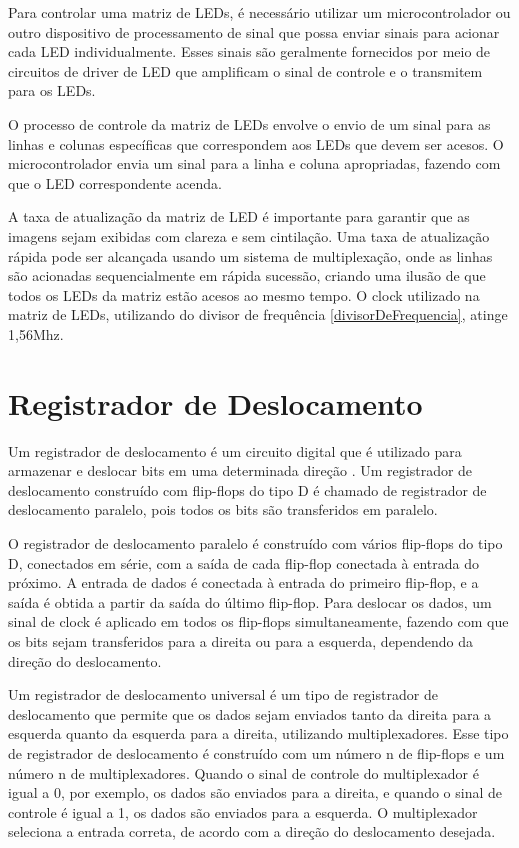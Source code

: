 Para controlar uma matriz de LEDs, é necessário utilizar um microcontrolador ou outro dispositivo de processamento de sinal que possa enviar sinais para acionar cada LED individualmente. Esses sinais são geralmente fornecidos por meio de circuitos de driver de LED que amplificam o sinal de controle e o transmitem para os LEDs.

O processo de controle da matriz de LEDs envolve o envio de um sinal para as linhas e colunas específicas que correspondem aos LEDs que devem ser acesos. O microcontrolador envia um sinal para a linha e coluna apropriadas, fazendo com que o LED correspondente acenda.

A taxa de atualização da matriz de LED é importante para garantir que as imagens sejam exibidas com clareza e sem cintilação. Uma taxa de atualização rápida pode ser alcançada usando um sistema de multiplexação, onde as linhas são acionadas sequencialmente em rápida sucessão, criando uma ilusão de que todos os LEDs da matriz estão acesos ao mesmo tempo. O clock utilizado na matriz de LEDs, utilizando do divisor de frequência \ref{divisorDeFrequencia}, atinge 1,56Mhz.

\section{Registrador de Deslocamento}
Um registrador de deslocamento é um circuito digital que é utilizado para armazenar e deslocar bits em uma determinada direção \cite{tocci2010sistemas}. Um registrador de deslocamento construído com flip-flops do tipo D é chamado de registrador de deslocamento paralelo, pois todos os bits são transferidos em paralelo.

O registrador de deslocamento paralelo é construído com vários flip-flops do tipo D, conectados em série, com a saída de cada flip-flop conectada à entrada do próximo. A entrada de dados é conectada à entrada do primeiro flip-flop, e a saída é obtida a partir da saída do último flip-flop. Para deslocar os dados, um sinal de clock é aplicado em todos os flip-flops simultaneamente, fazendo com que os bits sejam transferidos para a direita ou para a esquerda, dependendo da direção do deslocamento.

Um registrador de deslocamento universal é um tipo de registrador de deslocamento que permite que os dados sejam enviados tanto da direita para a esquerda quanto da esquerda para a direita, utilizando multiplexadores. Esse tipo de registrador de deslocamento é construído com um número n de flip-flops e um número n de multiplexadores. Quando o sinal de controle do multiplexador é igual a 0, por exemplo, os dados são enviados para a direita, e quando o sinal de controle é igual a 1, os dados são enviados para a esquerda. O multiplexador seleciona a entrada correta, de acordo com a direção do deslocamento desejada.

